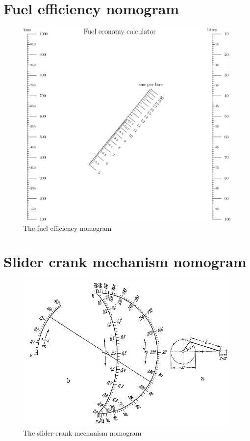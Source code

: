 \documentclass{l4proj}
\begin{document}
\begin{appendices}
\section{Fuel efficiency nomogram}
\begin{figure}[H]
        \centering
        \includegraphics[width=1\linewidth]{dissertation//images//myFigures//appendix/fuel.jpg}
        \caption{The fuel efficiency nomogram \citep{boulet_PyNomo_2023}}
        \label{fig:fuel-efficiency}
    \end{figure}
\section{Slider crank mechanism nomogram}
\begin{figure}[H]
        \centering
        \includegraphics[width=1\linewidth]{dissertation//images//myFigures//appendix/meyer.png}
        \caption{The slider-crank mechanism nomogram \citep{boulet_PyNomo_2023}}
        \label{fig:slider-crank} 
    \end{figure}


\end{appendices}
\end{document}
